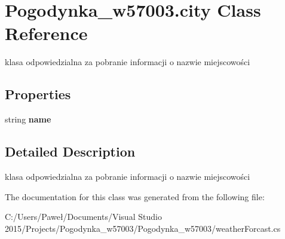 \hypertarget{class_pogodynka__w57003_1_1city}{}\section{Pogodynka\+\_\+w57003.\+city Class Reference}
\label{class_pogodynka__w57003_1_1city}


klasa odpowiedzialna za pobranie informacji o nazwie miejscowości  


\subsection*{Properties}
\begin{DoxyCompactItemize}
\item 
\mbox{\label{class_pogodynka__w57003_1_1city_a160a2b22892d59b257efb2b7eb135f9b}} 
string {\bfseries name}
\end{DoxyCompactItemize}


\subsection{Detailed Description}
klasa odpowiedzialna za pobranie informacji o nazwie miejscowości 



The documentation for this class was generated from the following file\+:\begin{DoxyCompactItemize}
\item 
C\+:/\+Users/\+Paweł/\+Documents/\+Visual Studio 2015/\+Projects/\+Pogodynka\+\_\+w57003/\+Pogodynka\+\_\+w57003/weather\+Forcast.\+cs\end{DoxyCompactItemize}
